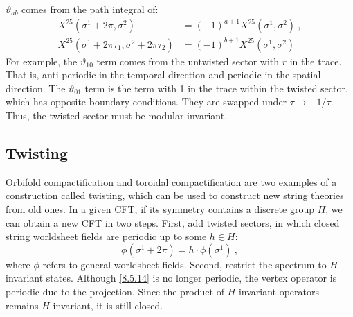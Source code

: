 $\vartheta_{a b}$ comes from the path integral of:
\begin{subequations} \label{8.5.13}
	\begin{align}
		X^{25}(\sigma^{1}+2 \pi, \sigma^{2}) &= (-1)^{a+1} X^{25}(\sigma^{1}, \sigma^{2}) \:, \label{8.5.13a}  \\
		X^{25}(\sigma^{1}+2 \pi \tau_{1}, \sigma^{2}+2 \pi \tau_{2}) &= (-1)^{b+1} X^{25}(\sigma^{1}, \sigma^{2})  \label{8.5.13b}
	\end{align}
\end{subequations}
For example, the $\vartheta_{10}$ term comes from the untwisted sector with $r$ in the trace. That is, anti-periodic in the temporal direction and periodic in the spatial direction. 
The $\vartheta_{01}$ term is the term with 1 in the trace within the twisted sector, which has opposite boundary conditions. They are swapped under $\tau \rightarrow-1/\tau$. 
Thus, the twisted sector must be modular invariant.

\subsection*{Twisting}
Orbifold compactification and toroidal compactification are two examples of a construction called twisting, which can be used to construct new string theories from old ones. 
In a given CFT, if its symmetry contains a discrete group $H$, we can obtain a new CFT in two steps. 
First, add twisted sectors, in which closed string worldsheet fields are periodic up to some $h \in H$:
\begin{equation}
	\phi(\sigma^{1}+2 \pi )=h \cdot \phi(\sigma^{1}) \:, \label{8.5.14}
\end{equation}
where $\phi$ refers to general worldsheet fields. 
Second, restrict the spectrum to $H$-invariant states. Although \eqref{8.5.14} is no longer periodic, the vertex operator is periodic due to the projection. 
Since the product of $H$-invariant operators remains $H$-invariant, it is still closed. 

